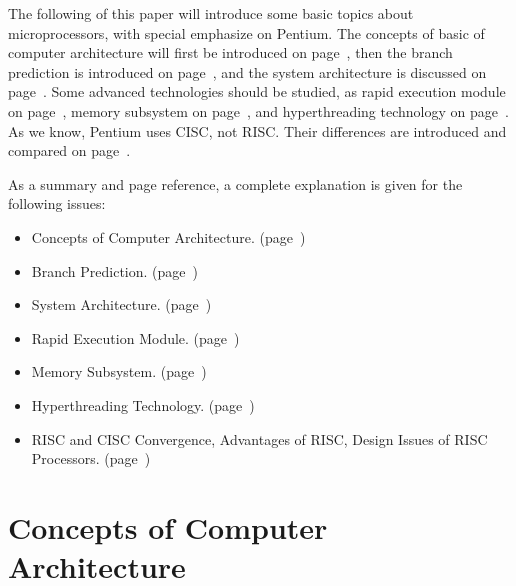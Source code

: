 \documentclass[doc,natbib,12pt]{apa6}
\begin{document}
	The following of this paper will introduce some basic topics about microprocessors, with special emphasize on Pentium. The concepts of basic of computer architecture will first be introduced on page~\pageref{chp:computerArchitecture}, then the branch prediction is introduced on page~\pageref{chp:branchPrediction}, and the system architecture is discussed on page~\pageref{chp:systemArchitecture}. Some advanced technologies should be studied, as rapid execution module on page~\pageref{chp:rapidExecutionModule}, memory subsystem on page~\pageref{chp:memorySubsystem}, and hyperthreading technology on page~\pageref{chp:hyperthreadingTechnology}. As we know, Pentium uses CISC, not RISC. Their differences are introduced and compared on page~\pageref{chp:RISCvsCISC}.
	
	As a summary and page reference, a complete explanation is given for the following issues:
	
	\begin{itemize}
		
		
		\item   Concepts of Computer Architecture. (page~\pageref{chp:computerArchitecture})
		
		
		\item   Branch Prediction. (page~\pageref{chp:branchPrediction})
		
		\item   System Architecture. (page~\pageref{chp:systemArchitecture})
		
		\item   Rapid Execution Module. (page~\pageref{chp:rapidExecutionModule})
		
		\item   Memory Subsystem. (page~\pageref{chp:memorySubsystem})
		
		\item   Hyperthreading Technology. (page~\pageref{chp:hyperthreadingTechnology})
		
		\item   RISC and CISC Convergence, Advantages of RISC, Design Issues of RISC Processors. (page~\pageref{chp:RISCvsCISC})
		
	\end{itemize}
	
	
	
	\newpage
	\section{Concepts of Computer Architecture} \label{chp:computerArchitecture}
	
\end{document}
